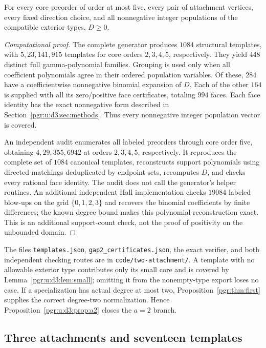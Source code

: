 \documentclass[11pt]{article}
\numberwithin{equation}{section}
\theoremstyle{definition}\newtheorem{definition}[theorem]{Definition}\newtheorem{remark}[theorem]{Remark}
\begin{document}
\begin{proposition}\label{pgr:u:d3:prop:a2}
For every core preorder of order at most five, every pair of attachment vertices, every fixed direction choice, and all nonnegative integer populations of the compatible exterior types, $D\ge0$.
\end{proposition}
\begin{proof}[Computational proof]
The complete generator produces $1084$ structural templates, with $5,23,141,915$ templates for core orders $2,3,4,5$, respectively. They yield $448$ distinct full gamma-polynomial families. Grouping is used only when all coefficient polynomials agree in their ordered population variables. Of these, $284$ have a coefficientwise nonnegative binomial expansion of $D$. Each of the other $164$ is supplied with all its zero/positive face certificates, totaling $994$ faces. Each face identity has the exact nonnegative form described in Section~\ref{pgr:u:d3:sec:methods}. Thus every nonnegative integer population vector is covered.

An independent audit enumerates all labeled preorders through core order five, obtaining $4,29,355,6942$ at orders $2,3,4,5$, respectively. It reproduces the complete set of $1084$ canonical templates, reconstructs support polynomials using directed matchings deduplicated by endpoint sets, recomputes $D$, and checks every rational face identity. The audit does not call the generator's helper routines. An additional independent Hall implementation checks $19084$ labeled blow-ups on the grid $\{0,1,2,3\}$ and recovers the binomial coefficients by finite differences; the known degree bound makes this polynomial reconstruction exact. This is an additional support-count check, not the proof of positivity on the unbounded domain.
\end{proof}

The files \texttt{templates.json}, \texttt{gap2\_certificates.json}, the exact verifier, and both independent checking routes are in \texttt{code/two-attachment/}. A template with no allowable exterior type contributes only its small core and is covered by Lemma~\ref{pgr:u:d3:lem:small}; omitting it from the nonempty-type export loses no case. If a specialization has actual degree at most two, Proposition~\ref{pgr:thm:first} supplies the correct degree-two normalization. Hence Proposition~\ref{pgr:u:d3:prop:a2} closes the $a=2$ branch.

\subsection{Three attachments and seventeen templates}\label{pgr:u:d3:sec:a3}
\end{document}
